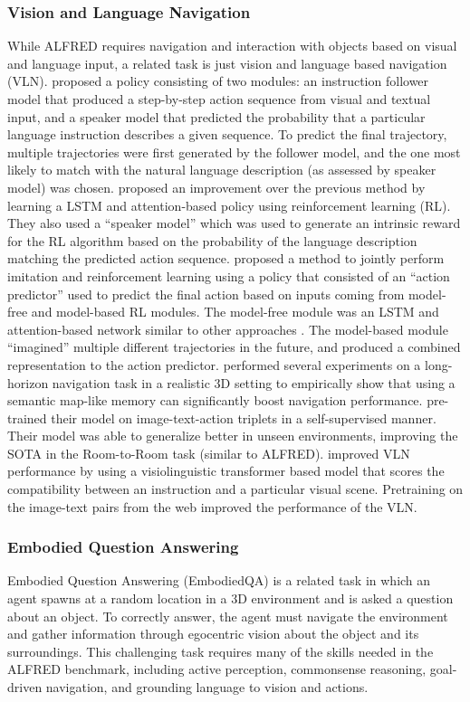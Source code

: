 \documentclass[11pt,a4paper]{article}
\begin{document}
\subsubsection{Vision and Language Navigation}
\label{ssec:vln}
While ALFRED requires navigation and interaction with objects based on visual and language input, a related task is just vision and language based navigation (VLN). \cite{fried2018speaker} proposed a policy consisting of two modules: an instruction follower model that produced a step-by-step action sequence from visual and textual input, and a speaker model that predicted the probability that a particular language instruction describes a given sequence. To predict the final trajectory, multiple trajectories were first generated by the follower model, and the one most likely to match with the natural language description (as assessed by speaker model) was chosen. \cite{wang2019reinforced} proposed an improvement over the previous method by learning a LSTM \cite{hochreiter1997long} and attention-based policy using reinforcement learning (RL). They also used a ``speaker model'' which was used to generate an intrinsic reward for the RL algorithm based on the probability of the language description matching the predicted action sequence. \cite{wang2018look} proposed a method to jointly perform imitation and reinforcement learning using a policy that consisted of an ``action predictor'' used to predict the final action based on inputs coming from model-free and model-based RL modules. The model-free module was an LSTM and attention-based network similar to other approaches \cite{shridhar2020alfred, wang2019reinforced}. The model-based module ``imagined'' multiple different trajectories in the future, and produced a combined representation to the action predictor. \cite{wani2020multion} performed several experiments on a long-horizon navigation task in a realistic 3D setting to empirically show that using a semantic map-like memory can significantly boost navigation performance. \cite{hao2020learning} pre-trained their model on image-text-action triplets in a self-supervised manner. Their model was able to generalize better in unseen environments, improving the SOTA in the Room-to-Room task (similar to ALFRED). \cite{majumdar2020improving} improved VLN performance by using a visiolinguistic transformer based model that scores the compatibility between an instruction and a particular visual scene. Pretraining on the image-text pairs from the web improved the performance of the VLN.

\subsubsection{Embodied Question Answering}
\label{ssec:eqa}
Embodied Question Answering \cite{Das2018EmbodiedQA} (EmbodiedQA) is a related task in which an agent spawns at a random location in a 3D environment and is asked a question about an object. To correctly answer, the agent must navigate the environment and gather information through egocentric vision about the object and its surroundings. This challenging task requires many of the skills needed in the ALFRED benchmark, including active perception, commonsense reasoning, goal-driven navigation, and grounding language to vision and actions. 
\end{document}

